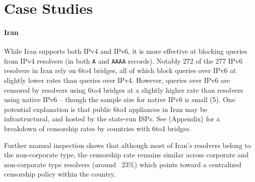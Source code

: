 \section{Case Studies}
\label{sec:cases}

% 

\paragraph{Iran}
While Iran supports both IPv4 and IPv6, it is more effective at blocking queries
from IPv4 resolvers (in both \texttt{A} and \texttt{AAAA} records). Notably 272
of the 277 IPv6 resolvers in Iran rely on 6to4 bridges, all of which block
queries over IPv6 at slightly lower rates than queries over IPv4. However,
queries over IPv6 are censored by resolvers using 6to4 bridges at a slightly
higher rate than resolvers using native IPv6 -- though the sample size for
native IPv6 is small (5). One potential explanation is that public 6to4
appliances in Iran may be infrastructural, and hosted by the state-run ISPs. See
 (Appendix) for a breakdown of censorship
rates by countries with 6to4 bridges.

Further manual inspection shows that although most of Iran's resolvers belong
to the non-corporate type, the censorship rate remains similar across
corporate and non-corporate type resolvers (around ~23\%) which points toward a
centralized censorship policy within the country.


